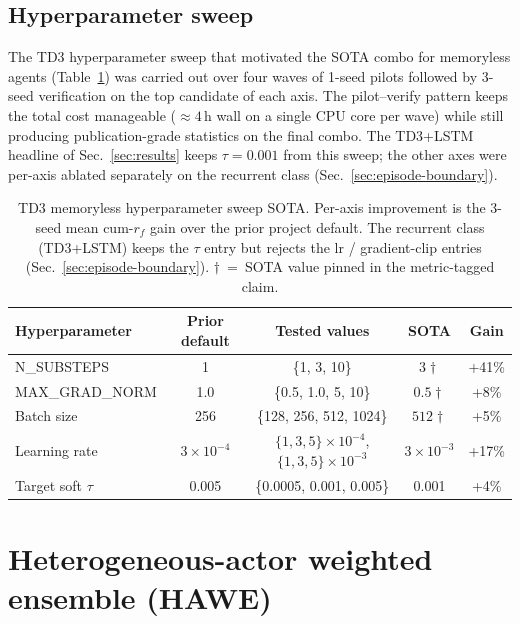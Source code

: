\documentclass[journal,onecolumn,11pt]{IEEEtran}
\begin{document}
\subsection{Hyperparameter sweep}\label{sec:hparams}

The TD3 hyperparameter sweep that motivated the SOTA combo for
memoryless agents (Table~\ref{tab:hparams}) was carried out over
four waves of 1-seed pilots followed by 3-seed verification on the
top candidate of each axis. The pilot--verify pattern keeps the
total cost manageable ($\approx 4$\,h wall on a single CPU core
per wave) while still producing publication-grade statistics on the
final combo. The TD3+LSTM headline of Sec.~\ref{sec:results} keeps
$\tau = 0.001$ from this sweep; the other axes were per-axis
ablated separately on the recurrent class
(Sec.~\ref{sec:episode-boundary}).

\begin{table}[!t]
  \centering
  \caption{TD3 memoryless hyperparameter sweep SOTA. Per-axis
  improvement is the 3-seed mean cum-$r_f$ gain over the prior
  project default. The recurrent class (TD3+LSTM) keeps the
  $\tau$ entry but rejects the lr / gradient-clip entries
  (Sec.~\ref{sec:episode-boundary}). $\dagger$~=~SOTA value
  pinned in the metric-tagged claim.}
  \label{tab:hparams}
  \begin{tabular}{lcccc}
    \toprule
    Hyperparameter   & Prior default & Tested values     & SOTA            & Gain   \\
    \midrule
    N\_SUBSTEPS      & 1             & \{1, 3, 10\}      & $3\dagger$      & +41\%  \\
    MAX\_GRAD\_NORM  & 1.0           & \{0.5, 1.0, 5, 10\} & $0.5\dagger$  & +8\%   \\
    Batch size       & 256           & \{128, 256, 512, 1024\} & $512\dagger$ & +5\% \\
    Learning rate    & $3\times10^{-4}$ & $\{1, 3, 5\}\times10^{-4}$, $\{1, 3, 5\}\times10^{-3}$ & $3\times10^{-3}$ & +17\% \\
    Target soft $\tau$ & 0.005       & \{0.0005, 0.001, 0.005\} & 0.001     & +4\%   \\
    \bottomrule
  \end{tabular}
\end{table}

\section{Heterogeneous-actor weighted ensemble (HAWE)}\label{sec:hawe}
\end{document}
